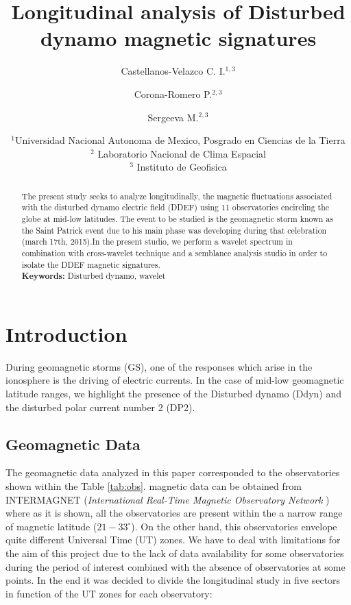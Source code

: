 \documentclass[a4paper]{article}
\title{Longitudinal analysis of Disturbed dynamo magnetic signatures}
\author{Castellanos-Velazco C. I.$^{1,3}$ \and Corona-Romero P.$^{2,3}$ \and Sergeeva M.$^{2,3}$}
\date{
	$^1$Universidad Nacional Autonoma de Mexico, Posgrado en Ciencias de la Tierra \\ %
	$^2$ Laboratorio Nacional de Clima Espacial \\
	$^3$ Instituto de Geofisica
}
\theoremstyle{plain}
\theoremstyle{definition}
\begin{document}
	\maketitle
	
	\begin{abstract}
		
		The present study seeks to analyze longitudinally, the magnetic fluctuations associated with the disturbed dynamo electric field (DDEF) using 11 observatories encircling the globe at mid-low latitudes. The event to be studied is the geomagnetic storm known as the Saint Patrick event due to his main phase was developing during that celebration (march 17th, 2015).In the present studio, we perform a wavelet spectrum in combination with cross-wavelet technique and a semblance analysis studio in order to isolate the DDEF magnetic signatures.  
		\\
		
		\noindent\textbf{Keywords:} Disturbed dynamo, wavelet
	\end{abstract}

	\tableofcontents
	
	\section{Introduction}
	\label{sec:intro}
		
	During geomagnetic storms (GS), one of the responses which arise in the ionosphere is the driving of electric currents. In the case of mid-low geomagnetic latitude ranges, we highlight the presence of the Disturbed dynamo (Ddyn) and the disturbed polar current number 2 (DP2). \\
	
	\subsection{Geomagnetic Data}
	The geomagnetic data analyzed in this paper corresponded to the observatories shown within the Table \ref{tab:obs}. magnetic data can be obtained from INTERMAGNET (\textit{International Real-Time Magnetic Observatory Network} \citep{intermagnet})  where as it is shown, all the observatories are present within the a narrow range of magnetic latitude ($21 - 33^\circ$). On the other hand, this observatories envelope quite different Universal Time (UT) zones. We have to deal with limitations for the aim of this project due to the lack of data availability for some observatories during the period of interest combined with the absence of observatories at some points. In the end it was decided to divide the longitudinal study in five sectors in function of the UT zones for each observatory:
	
\end{document}
